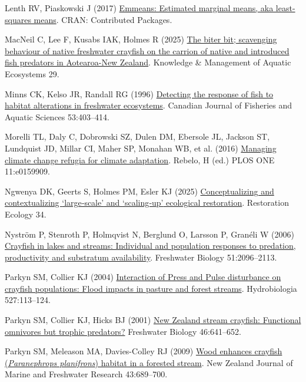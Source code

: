 \documentclass[
  letterpaper,
  DIV=11,
  numbers=noendperiod]{scrartcl}
\newlength{\cslhangindent}
\newenvironment{CSLReferences}[2] %
 {\begin{list}{}{%
  \setlength{\itemindent}{0pt}
  \setlength{\leftmargin}{0pt}
  \setlength{\parsep}{0pt}
  \ifodd #1
   \setlength{\leftmargin}{\cslhangindent}
   \setlength{\itemindent}{-1\cslhangindent}
  \fi
  \setlength{\itemsep}{#2\baselineskip}}}
 {\end{list}}
\begin{document}
\begin{CSLReferences}{1}{1}
Lenth RV, Piaskowski J (2017)
\href{https://doi.org/10.32614/cran.package.emmeans}{Emmeans: Estimated
marginal means, aka least-squares means}. CRAN: Contributed Packages.

MacNeil C, Lee F, Kusabs IAK, Holmes R (2025)
\href{https://doi.org/10.1051/kmae/2025022}{The biter bit; scavenging
behaviour of native freshwater crayfish on the carrion of native and
introduced fish predators in {Aotearoa-New Zealand}}. Knowledge \&
Management of Aquatic Ecosystems 29.

Minns CK, Kelso JR, Randall RG (1996)
\href{https://doi.org/10.1139/f95-262}{Detecting the response of fish to
habitat alterations in freshwater ecosystems}. Canadian Journal of
Fisheries and Aquatic Sciences 53:403--414.

Morelli TL, Daly C, Dobrowski SZ, Dulen DM, Ebersole JL, Jackson ST,
Lundquist JD, Millar CI, Maher SP, Monahan WB, et al. (2016)
\href{https://doi.org/10.1371/journal.pone.0159909}{Managing climate
change refugia for climate adaptation}. Rebelo, H (ed.) PLOS ONE
11:e0159909.

Ngwenya DK, Geerts S, Holmes PM, Esler KJ (2025)
\href{https://doi.org/10.1111/rec.70266}{Conceptualizing and
contextualizing {`large‐scale'} and {`scaling‐up'} ecological
restoration}. Restoration Ecology 34.

Nyström P, Stenroth P, Holmqvist N, Berglund O, Larsson P, Granéli W
(2006) \href{https://doi.org/10.1111/j.1365-2427.2006.01641.x}{Crayfish
in lakes and streams: Individual and population responses to predation,
productivity and substratum availability}. Freshwater Biology
51:2096--2113.

Parkyn SM, Collier KJ (2004)
\href{https://doi.org/10.1023/b:hydr.0000043189.91134.94}{Interaction of
{Press} and {Pulse} disturbance on crayfish populations: Flood impacts
in pasture and forest streams}. Hydrobiologia 527:113--124.

Parkyn SM, Collier KJ, Hicks BJ (2001)
\href{https://doi.org/10.1046/j.1365-2427.2001.00702.x}{{New Zealand}
stream crayfish: Functional omnivores but trophic predators?} Freshwater
Biology 46:641--652.

Parkyn SM, Meleason MA, Davies-Colley RJ (2009)
\href{https://doi.org/10.1080/00288330909510034}{Wood enhances crayfish
({\emph{Paranephrops planifrons}}) habitat in a forested stream}. New
Zealand Journal of Marine and Freshwater Research 43:689--700.


\end{CSLReferences}
\end{document}
